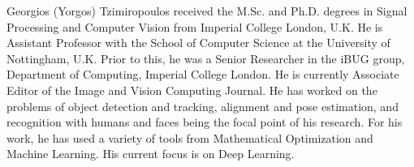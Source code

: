 \documentclass[10pt,journal,compsoc]{IEEEtran}
\begin{document}
\begin{IEEEbiography}{Georgios (Yorgos) Tzimiropoulos}  received the M.Sc. and Ph.D. degrees in Signal Processing and Computer Vision from Imperial College London, U.K. He is Assistant Professor with the School of Computer Science at the University of Nottingham, U.K. Prior to this, he was a Senior Researcher in the iBUG group, Department of Computing, Imperial College London. He is currently Associate Editor of the Image and Vision Computing Journal. He has worked on the problems of object detection and tracking, alignment and pose estimation, and recognition with humans and faces being the focal point of his research. For his work, he has used a variety of tools from Mathematical Optimization and Machine Learning. His current focus is on Deep Learning. 
\end{IEEEbiography}
\end{document}
